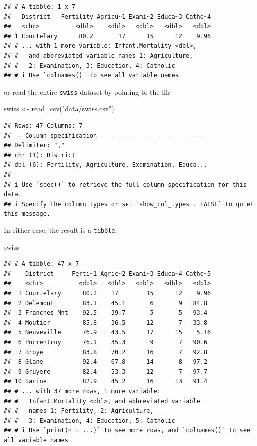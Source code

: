 \documentclass[
  12pt,
]{style/krantz}
\newenvironment{Shaded}{\begin{snugshade}}{\end{snugshade}}
\newcommand{\FunctionTok}[1]{\textcolor[rgb]{0.00,0.00,0.00}{#1}}
\newcommand{\NormalTok}[1]{#1}
\newcommand{\OtherTok}[1]{\textcolor[rgb]{0.56,0.35,0.01}{#1}}
\newcommand{\StringTok}[1]{\textcolor[rgb]{0.31,0.60,0.02}{#1}}
\begin{document}
\begin{verbatim}
## # A tibble: 1 x 7
##   District   Fertility Agricu~1 Exami~2 Educa~3 Catho~4
##   <chr>          <dbl>    <dbl>   <dbl>   <dbl>   <dbl>
## 1 Courtelary      80.2       17      15      12    9.96
## # ... with 1 more variable: Infant.Mortality <dbl>,
## #   and abbreviated variable names 1: Agriculture,
## #   2: Examination, 3: Education, 4: Catholic
## # i Use `colnames()` to see all variable names
\end{verbatim}

or read the entire \texttt{swiss} dataset by pointing to the file

\begin{Shaded}
\begin{Highlighting}[]
\NormalTok{swiss }\OtherTok{\textless{}{-}} \FunctionTok{read\_csv}\NormalTok{(}\StringTok{"data/swiss.csv"}\NormalTok{)}
\end{Highlighting}
\end{Shaded}

\begin{verbatim}
## Rows: 47 Columns: 7
## -- Column specification -------------------------------
## Delimiter: ","
## chr (1): District
## dbl (6): Fertility, Agriculture, Examination, Educa...
## 
## i Use `spec()` to retrieve the full column specification for this data.
## i Specify the column types or set `show_col_types = FALSE` to quiet this message.
\end{verbatim}

In either case, the result is a \texttt{tibble}:

\begin{Shaded}
\begin{Highlighting}[]
\NormalTok{swiss}
\end{Highlighting}
\end{Shaded}

\begin{verbatim}
## # A tibble: 47 x 7
##    District     Ferti~1 Agric~2 Exami~3 Educa~4 Catho~5
##    <chr>          <dbl>   <dbl>   <dbl>   <dbl>   <dbl>
##  1 Courtelary      80.2    17        15      12    9.96
##  2 Delemont        83.1    45.1       6       9   84.8 
##  3 Franches-Mnt    92.5    39.7       5       5   93.4 
##  4 Moutier         85.8    36.5      12       7   33.8 
##  5 Neuveville      76.9    43.5      17      15    5.16
##  6 Porrentruy      76.1    35.3       9       7   90.6 
##  7 Broye           83.8    70.2      16       7   92.8 
##  8 Glane           92.4    67.8      14       8   97.2 
##  9 Gruyere         82.4    53.3      12       7   97.7 
## 10 Sarine          82.9    45.2      16      13   91.4 
## # ... with 37 more rows, 1 more variable:
## #   Infant.Mortality <dbl>, and abbreviated variable
## #   names 1: Fertility, 2: Agriculture,
## #   3: Examination, 4: Education, 5: Catholic
## # i Use `print(n = ...)` to see more rows, and `colnames()` to see all variable names
\end{verbatim}
\end{document}
